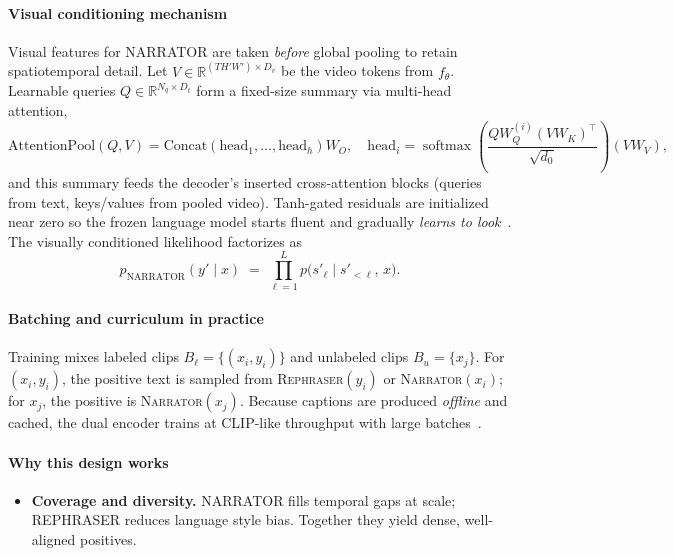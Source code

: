 \begin{enrichment}
\begin{enrichment}
        \paragraph{Visual conditioning mechanism}
        Visual features for NARRATOR are taken \emph{before} global pooling to retain spatiotemporal detail. Let $V\in\mathbb{R}^{(T H' W')\times D_v}$ be the video tokens from $f_\theta$. Learnable queries $Q\in\mathbb{R}^{N_q\times D_t}$ form a fixed\mbox{-}size summary via multi\mbox{-}head attention,
        \begin{equation}
            \mathrm{AttentionPool}(Q,V)
            =\mathrm{Concat}(\mathrm{head}_1,\dots,\mathrm{head}_h)W_O,\quad
            \mathrm{head}_i=\operatorname{softmax}\!\left(\frac{QW_Q^{(i)}(VW_K)^\top}{\sqrt{d_0}}\right)(VW_V),
            \label{eq:chapter24_lavila_attnpool}
        \end{equation}
        and this summary feeds the decoder’s inserted cross\mbox{-}attention blocks (queries from text, keys/values from pooled video). Tanh\mbox{-}gated residuals are initialized near zero so the frozen language model starts fluent and gradually \emph{learns to look}~\cite{zhao2022_lavila}. The visually conditioned likelihood factorizes as
        \begin{equation}
            p_{\text{NARRATOR}}(y' \mid x) \;=\; \prod_{\ell=1}^{L} p\!\big(s'_\ell \mid s'_{<\ell},\, x\big).
            \label{eq:chapter24_lavila_narrator}
        \end{equation}
        
        \paragraph{Batching and curriculum in practice}
        Training mixes labeled clips $B_\ell=\{(x_i,y_i)\}$ and unlabeled clips $B_u=\{x_j\}$. For $(x_i,y_i)$, the positive text is sampled from \textsc{Rephraser}$(y_i)$ or \textsc{Narrator}$(x_i)$; for $x_j$, the positive is \textsc{Narrator}$(x_j)$. Because captions are produced \emph{offline} and cached, the dual encoder trains at CLIP\mbox{-}like throughput with large batches~\cite{zhao2022_lavila}.
        
        \paragraph{Why this design works}
        \begin{itemize}
            \item \textbf{Coverage and diversity.} NARRATOR fills temporal gaps at scale; REPHRASER reduces language style bias. Together they yield dense, well\mbox{-}aligned positives.
            

\end{itemize}
\end{enrichment}
\end{enrichment}
